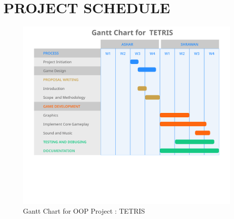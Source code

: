 \newpage
\section{PROJECT SCHEDULE}

\begin{figure}[H]
	\centering
	\includegraphics[width=\textwidth]{images/Gantt.png}
	\caption{Gantt Chart for OOP Project : TETRIS }
\end{figure}

